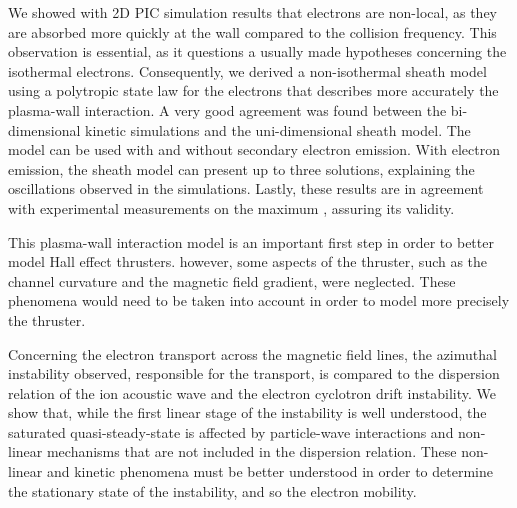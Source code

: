 We showed with 2D PIC simulation results that electrons are non-local, as they are absorbed more quickly at the wall compared to the collision frequency.
This observation is essential, as it questions a usually made hypotheses concerning the isothermal electrons.
Consequently, we derived a non-isothermal sheath model using a polytropic state law for the electrons that describes more accurately the plasma-wall interaction.
A very good agreement was found between the bi-dimensional kinetic simulations and the uni-dimensional sheath model.
The model can be used with and without secondary electron emission.
With electron emission, the sheath model can present up to three solutions, explaining the oscillations observed in the simulations. 
Lastly, these results are in agreement with experimental measurements on the maximum , assuring its validity.

This plasma-wall interaction model is an important first step in order to better model Hall effect thrusters.
however, some aspects of the thruster, such as the channel curvature and the magnetic field gradient, were neglected.
These phenomena would need to be taken into account in order to model more precisely the thruster.

Concerning the electron transport across the magnetic field lines, the azimuthal instability observed, responsible for the transport, is compared to the dispersion relation of the ion acoustic wave and the electron cyclotron drift instability.
We show that, while the first linear stage of the instability is well understood, the saturated quasi-steady-state is affected by particle-wave interactions and non-linear mechanisms that are not included in the dispersion relation.
These non-linear and kinetic phenomena must be better understood in order to determine the stationary state of the instability, and so the electron mobility.
